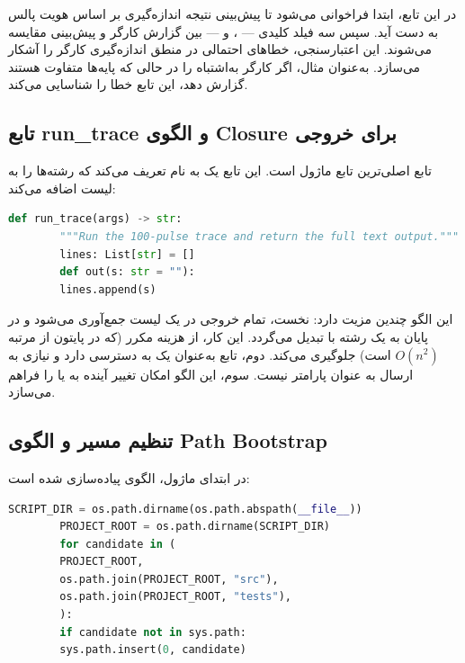 در این تابع، ابتدا  فراخوانی می‌شود تا پیش‌بینی نتیجه اندازه‌گیری بر اساس هویت پالس به دست آید. سپس سه فیلد کلیدی — ،  و  — بین گزارش کارگر و پیش‌بینی مقایسه می‌شوند. این اعتبارسنجی، خطاهای احتمالی در منطق اندازه‌گیری کارگر را آشکار می‌سازد. به‌عنوان مثال، اگر کارگر به‌اشتباه  را در حالی که پایه‌ها متفاوت هستند گزارش دهد، این تابع خطا را شناسایی می‌کند.

\subsection{تابع run\_trace و الگوی Closure برای خروجی}

تابع  اصلی‌ترین تابع ماژول است. این تابع یک  به نام  تعریف می‌کند که رشته‌ها را به لیست  اضافه می‌کند:

\begin{LTR}
	\begin{lstlisting}[language=Python]
		def run_trace(args) -> str:
		"""Run the 100-pulse trace and return the full text output."""
		lines: List[str] = []
		def out(s: str = ""):
		lines.append(s)
	\end{lstlisting}
\end{LTR}

این الگو چندین مزیت دارد: نخست، تمام خروجی در یک لیست جمع‌آوری می‌شود و در پایان به یک رشته با  تبدیل می‌گردد. این کار، از هزینه  مکرر (که در پایتون از مرتبه $O(n^2)$ است) جلوگیری می‌کند. دوم، تابع  به‌عنوان یک  به  دسترسی دارد و نیازی به ارسال  به عنوان پارامتر نیست. سوم، این الگو امکان تغییر آینده به  یا  را فراهم می‌سازد.

\subsection{تنظیم مسیر و الگوی Path Bootstrap}

در ابتدای ماژول، الگوی  پیاده‌سازی شده است:

\begin{LTR}
	\begin{lstlisting}[language=Python]
		SCRIPT_DIR = os.path.dirname(os.path.abspath(__file__))
		PROJECT_ROOT = os.path.dirname(SCRIPT_DIR)
		for candidate in (
		PROJECT_ROOT,
		os.path.join(PROJECT_ROOT, "src"),
		os.path.join(PROJECT_ROOT, "tests"),
		):
		if candidate not in sys.path:
		sys.path.insert(0, candidate)
	\end{lstlisting}
\end{LTR}

